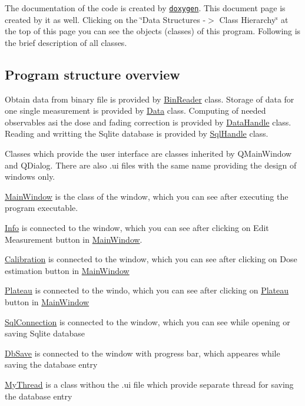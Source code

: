 The documentation of the code is created by \href{http://www.stack.nl/~dimitri/doxygen/}{\tt doxygen}. This document page is created by it as well. Clicking on the {\ttfamily  \char`\"{}\-Data Structures -\/$>$ Class Hierarchy\char`\"{} } at the top of this page you can see the objects (classes) of this program. Following is the brief description of all classes.\hypertarget{index_brief_dev}{}\subsection{Program structure overview}\label{index_brief_dev}
Obtain data from binary file is provided by \hyperlink{classBinReader}{Bin\-Reader} class. Storage of data for one single measurement is provided by \hyperlink{classData}{Data} class. Computing of needed observables asi the dose and fading correction is provided by \hyperlink{classDataHandle}{Data\-Handle} class. Reading and writting the {\ttfamily Sqlite} database is provided by \hyperlink{classSqlHandle}{Sql\-Handle} class.

Classes which provide the user interface are classes inherited by Q\-Main\-Window and Q\-Dialog. There are also .ui files with the same name providing the design of windows only.
\begin{DoxyItemize}
\item \hyperlink{classMainWindow}{Main\-Window} is the class of the window, which you can see after executing the program executable.
\item \hyperlink{classInfo}{Info} is connected to the window, which you can see after clicking on Edit Measurement button in \hyperlink{classMainWindow}{Main\-Window}.
\item \hyperlink{classCalibration}{Calibration} is connected to the window, which you can see after clicking on Dose estimation button in \hyperlink{classMainWindow}{Main\-Window}
\item \hyperlink{classPlateau}{Plateau} is connected to the windo, which you can see after clicking on \hyperlink{classPlateau}{Plateau} button in \hyperlink{classMainWindow}{Main\-Window}
\item \hyperlink{classSqlConnection}{Sql\-Connection} is connected to the window, which you can see while opening or saving {\ttfamily Sqlite} database
\item \hyperlink{classDbSave}{Db\-Save} is connected to the window with progress bar, which appeares while saving the database entry
\item \hyperlink{classMyThread}{My\-Thread} is a class withou the .ui file which provide separate thread for saving the database entry
\end{DoxyItemize}


